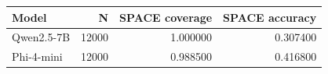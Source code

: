 \begin{tabular}{lrrr}
\toprule
Model & N & SPACE coverage & SPACE accuracy \\
\midrule
Qwen2.5-7B & 12000 & 1.000000 & 0.307400 \\
Phi-4-mini & 12000 & 0.988500 & 0.416800 \\
\bottomrule
\end{tabular}
